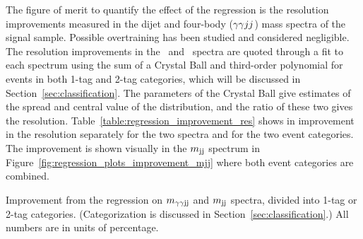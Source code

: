 The figure of merit to quantify the effect of the regression is the resolution improvements
measured in the dijet and four-body ($\gamma\gamma jj$) mass spectra of the signal sample.
Possible overtraining has been studied and considered negligible.
The resolution improvements in the \Mjj\, and \Mggjj\, spectra are quoted through a
fit to each spectrum using the sum of a Crystal Ball and third-order polynomial for events
in both 1-tag and 2-tag categories, which will be discussed in Section~\ref{sec:classification}.
The parameters of the Crystal Ball give estimates
of the spread and central value of the distribution, and the ratio of these two gives the resolution.
Table~\ref{table:regression_improvement_res} shows in improvement in the resolution separately
for the two spectra and for the two event categories.
The improvement is shown visually in the $m_{\rm jj}$ spectrum in
Figure~\ref{fig:regression_plots_improvement_mjj} where both event categories are combined.

\begin{table}[ht]
  \centering
  \renewcommand{\arraystretch}{1.4}
  \caption{Improvement from the regression on $m_{\gamma\gamma {\rm jj}}$ and $m_{\rm jj}$ spectra, divided into 1-tag or 2-tag
categories. (Categorization is discussed in Section~\ref{sec:classification}.)
All numbers are in units of percentage.}
  
  \label{table:regression_improvement_res}
\end{table}

